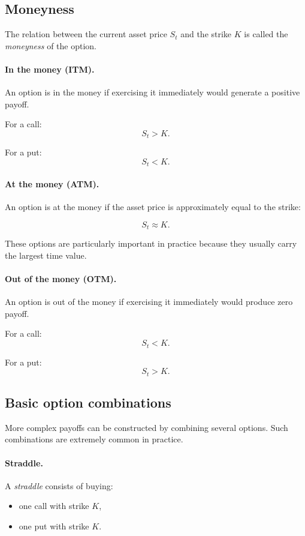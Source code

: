 \documentclass[11pt]{article}
\newcommand{\1}{\mathbf{1}}
\theoremstyle{plain}
\theoremstyle{definition}
\theoremstyle{remark}
\begin{document}
\subsection{Moneyness}

The relation between the current asset price \(S_t\) and the strike \(K\)
is called the \emph{moneyness} of the option.

\paragraph{In the money (ITM).}
An option is in the money if exercising it immediately would generate a positive payoff.

For a call:
\[
S_t > K.
\]

For a put:
\[
S_t < K.
\]

\paragraph{At the money (ATM).}
An option is at the money if the asset price is approximately equal to the strike:

\[
S_t \approx K.
\]

These options are particularly important in practice because they usually carry the largest time value.

\paragraph{Out of the money (OTM).}
An option is out of the money if exercising it immediately would produce zero payoff.

For a call:
\[
S_t < K.
\]

For a put:
\[
S_t > K.
\]

\subsection{Basic option combinations}

More complex payoffs can be constructed by combining several options.
Such combinations are extremely common in practice.

\paragraph{Straddle.}

A \emph{straddle} consists of buying:
\begin{itemize}[leftmargin=1.4em]
    \item one call with strike \(K\),
    \item one put with strike \(K\).
\end{itemize}
\end{document}
